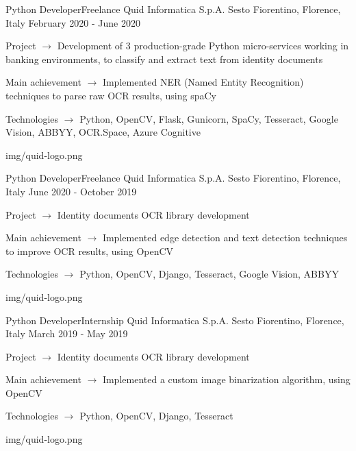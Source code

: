 
\begin{cventries}

  \logocventry
    {Python Developer{\enskip\cdotp\enskip}Freelance}
    {Quid Informatica S.p.A.}
    {Sesto Fiorentino, Florence, Italy}
    {February 2020 - June 2020}
    {
      \begin{cvitems}
        \item {Project $\rightarrow$ Development of 3 production-grade Python micro-services working in banking environments, 
               to classify and extract text from identity documents}
        \item {Main achievement $\rightarrow$ Implemented NER (Named Entity Recognition) techniques to parse raw OCR results, using spaCy}
        \item {Technologies $\rightarrow$ Python, OpenCV, Flask, Gunicorn, SpaCy, Tesseract, Google Vision, ABBYY, OCR.Space, Azure Cognitive}
      \end{cvitems}
    }
    {img/quid-logo.png}

  \logocventry
    {Python Developer{\enskip\cdotp\enskip}Freelance}
    {Quid Informatica S.p.A.}
    {Sesto Fiorentino, Florence, Italy}
    {June 2020 - October 2019}
    {
      \begin{cvitems}
        \item {Project $\rightarrow$ Identity documents OCR library development}
        \item {Main achievement $\rightarrow$ Implemented edge detection and text detection techniques to improve OCR results, using OpenCV}
        \item {Technologies $\rightarrow$ Python, OpenCV, Django, Tesseract, Google Vision, ABBYY}
      \end{cvitems}
    }
    {img/quid-logo.png}
  
  \logocventry
    {Python Developer{\enskip\cdotp\enskip}Internship}
    {Quid Informatica S.p.A.}
    {Sesto Fiorentino, Florence, Italy}
    {March 2019 - May 2019}
    {
      \begin{cvitems}
        \item {Project $\rightarrow$ Identity documents OCR library development}
        \item {Main achievement $\rightarrow$ Implemented a custom image binarization algorithm, using OpenCV}
        \item {Technologies $\rightarrow$ Python, OpenCV, Django, Tesseract}
      \end{cvitems}
    }
    {img/quid-logo.png}


\end{cventries}
